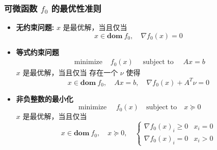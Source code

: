 \documentclass[handout]{beamer}
\begin{document}
	\begin{frame}
		\frametitle{可微函数 $f_0$ 的最优性准则}
		\begin{itemize}[<+->]
			\item \textbf{无约束问题:} $x$ 是最优解，当且仅当
			\begin{equation}
				x \in \textbf{dom}\ f_{0}, \quad \nabla f_{0}(x)=0
			\end{equation}
			\item \textbf{等式约束问题}
			\begin{equation}
				\begin{array}{cc}
					\text { minimize } & f_{0}(x) \quad \text { subject to } \quad A x=b
				\end{array}
			\end{equation}
			$x$ 是最优解，当且仅当 存在一个 $\nu$ 使得
			\begin{equation}
				x \in \textbf{dom}\ f_{0}, \quad A x=b, \quad \nabla f_{0}(x)+A^{T} \nu=0
			\end{equation}
			\item \textbf{非负整数的最小化}
			\begin{equation}
				\text{ minimize } \quad f_{0}(x) \quad \text{subject to} \quad x \succeq 0
			\end{equation}
			$x$ 是最优解，当且仅当
			\begin{equation}
				x \in \textbf{dom}\ f_{0}, \quad x \succeq 0, \quad\left\{\begin{array}{ll}
					\nabla f_{0}(x)_{i} \geq 0 & x_{i}=0 \\
					\nabla f_{0}(x)_{i}=0 & x_{i}>0
				\end{array}\right.
			\end{equation}
		\end{itemize}
	\end{frame}
\end{document}
